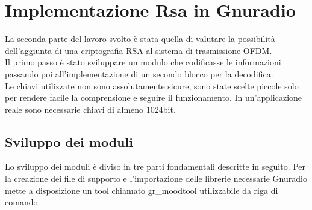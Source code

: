 \chapter{Implementazione Rsa in Gnuradio}
\label{cha:789}
La seconda parte del lavoro svolto è stata quella di valutare la possibilità dell'aggiunta di una criptografia RSA al sistema di trasmissione OFDM. \\Il primo passo è stato sviluppare un modulo che codificasse le informazioni passando poi all'implementazione di un secondo blocco per la decodifica.\\ Le chiavi utilizzate non sono assolutamente sicure, sono state scelte piccole solo per rendere facile la comprensione e seguire il funzionamento. In un'applicazione reale sono necessarie chiavi di almeno 1024bit.
\section{Sviluppo dei moduli}
Lo sviluppo dei moduli è diviso in tre parti fondamentali descritte in seguito. Per la creazione dei file di supporto e l'importazione delle librerie necessarie Gnuradio mette a disposizione un tool chiamato gr\_moodtool utilizzabile da riga di comando.
